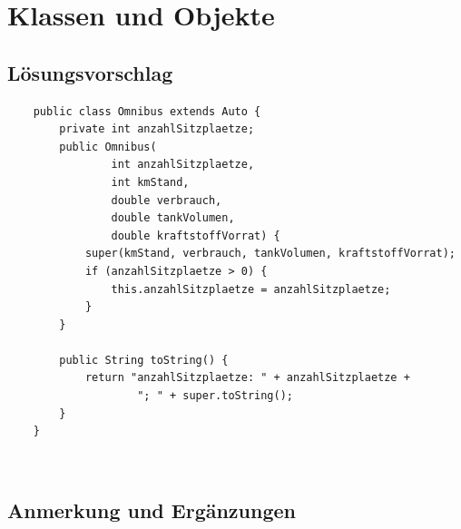\chapter{Klassen und Objekte}

\section{Lösungsvorschlag}


\begin{verbatim}
    public class Omnibus extends Auto {
        private int anzahlSitzplaetze;
        public Omnibus(
                int anzahlSitzplaetze,
                int kmStand,
                double verbrauch,
                double tankVolumen,
                double kraftstoffVorrat) {
            super(kmStand, verbrauch, tankVolumen, kraftstoffVorrat);
            if (anzahlSitzplaetze > 0) {
                this.anzahlSitzplaetze = anzahlSitzplaetze;
            }
        }

        public String toString() {
            return "anzahlSitzplaetze: " + anzahlSitzplaetze +
                    "; " + super.toString();
        }
    }
\end{verbatim}\\

\section{Anmerkung und Ergänzungen}

